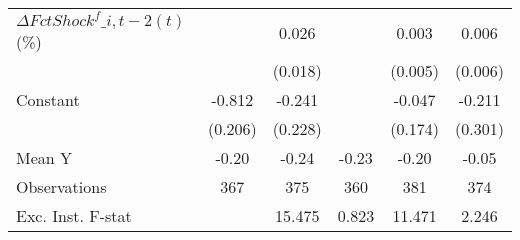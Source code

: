 {\begin{tabular}{l*{5}{c}}
\addlinespace
$ \Delta FctShock^f\_{i,t-2}(t)$ (\%)&                     &       0.026         &                     &       0.003         &       0.006         \\
                    &                     &     (0.018)         &                     &     (0.005)         &     (0.006)         \\
\addlinespace
Constant            &      -0.812\sym{***}&      -0.241         &                     &      -0.047         &      -0.211         \\
                    &     (0.206)         &     (0.228)         &                     &     (0.174)         &     (0.301)         \\
\midrule
Mean Y              &       -0.20         &       -0.24         &       -0.23         &       -0.20         &       -0.05         \\
Observations        &         367         &         375         &         360         &         381         &         374         \\
Exc. Inst. F-stat   &                     &      15.475         &       0.823         &      11.471         &       2.246         \\
\bottomrule
\end{tabular}
}
